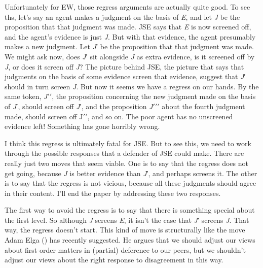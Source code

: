 \documentclass[
  11pt,
  letterpaper,
  DIV=11,
  numbers=noendperiod,
  twoside]{scrartcl}
\begin{document}
Unfortunately for EW, those regress arguments are actually quite good.
To see ths, let's say an agent makes a judgment on the basis of
\emph{E}, and let \emph{J} be the proposition that that judgment was
made. JSE says that \emph{E} is now screened off, and the agent's
evidence is just \emph{J}. But with that evidence, the agent presumably
makes a new judgment. Let \emph{J}′ be the proposition that that
judgment was made. We might ask now, does \emph{J}′ sit alongside
\emph{J} as extra evidence, is it screened off by \emph{J}, or does it
screen off \emph{J}? The picture behind JSE, the picture that says that
judgments on the basis of some evidence screen that evidence, suggest
that \emph{J}′ should in turn screen \emph{J}. But now it seems we have
a regress on our hands. By the same token, \emph{J}\(\prime \prime\),
the proposition concerning the new judgment made on the basis of
\emph{J}′, should screen off \emph{J}′, and the proposition
\emph{J}\(\prime \prime \prime\) about the fourth judgment made, should
screen off J\(\prime \prime\), and so on. The poor agent has no
unscreened evidence left! Something has gone horribly wrong.

I think this regress is ultimately fatal for JSE. But to see this, we
need to work through the possible responses that a defender of JSE could
make. There are really just two moves that seem viable. One is to say
that the regress does not get going, because \emph{J} is better evidence
than \emph{J}′, and perhaps screens it. The other is to say that the
regress is not vicious, because all these judgments should agree in
their content. I'll end the paper by addressing these two responses.

The first way to avoid the regress is to say that there is something
special about the first level. So although \emph{J} screens \emph{E}, it
isn't the case that \emph{J}′ screens \emph{J}. That way, the regress
doesn't start. This kind of move is structurally like the move Adam Elga
() has recently suggested. He argues
that we should adjust our views about first-order matters in (partial)
deference to our peers, but we shouldn't adjust our views about the
right response to disagreement in this way.
\end{document}
